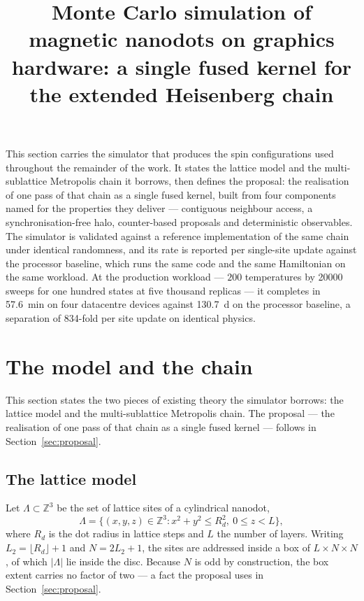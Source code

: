 \documentclass[11pt,a4paper]{article}
\title{\textbf{Monte Carlo simulation of magnetic nanodots on graphics
hardware: a single fused kernel for the extended Heisenberg chain}}
\author{}
\date{}
\begin{document}
\maketitle
\vspace{-2.2em}

\noindent
This section carries the simulator that produces the spin configurations used
throughout the remainder of the work. It states the lattice model and the
multi-sublattice Metropolis chain it borrows, then defines the proposal: the
realisation of one pass of that chain as a single fused kernel, built from four
components named for the properties they deliver --- contiguous neighbour
access, a synchronisation-free halo, counter-based proposals and deterministic
observables. The simulator is validated against a reference implementation of
the same chain under identical randomness, and its rate is reported per
single-site update against the processor baseline, which runs the same code and
the same Hamiltonian on the same workload. At the production workload --- $200$ temperatures by
\num{20000} sweeps for one hundred states at five thousand replicas --- it
completes in \SI{57.6}{\minute} on four datacentre devices against
\SI{130.7}{\day} on the processor baseline, a separation of
\num{834}-fold per site update on identical physics.

\section{The model and the chain}

This section states the two pieces of existing theory the simulator borrows:
the lattice model and the multi-sublattice Metropolis chain. The proposal ---
the realisation of one pass of that chain as a single fused kernel --- follows
in Section~\ref{sec:proposal}.

\subsection{The lattice model}
\label{sec:model}

Let $\Lambda \subset \mathbb{Z}^3$ be the set of lattice sites of a cylindrical
nanodot,
%
\begin{equation}
\Lambda = \bigl\{(x,y,z) \in \mathbb{Z}^3 :
   x^2 + y^2 \le R_d^2,\ 0 \le z < L \bigr\},
\label{eq:lattice}
\end{equation}
%
where $R_d$ is the dot radius in lattice steps and $L$ the number of layers.
Writing $L_2 = \lfloor R_d \rfloor + 1$ and $N = 2L_2 + 1$, the sites are
addressed inside a box of $L \times N \times N$, of which $|\Lambda|$ lie inside
the disc. Because $N$ is odd by construction, the box extent carries no factor
of two --- a fact the proposal uses in Section~\ref{sec:proposal}.
\end{document}
